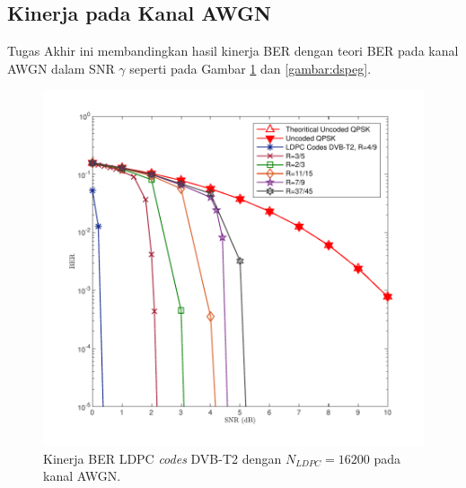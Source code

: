 \subsection{Kinerja pada Kanal AWGN}
Tugas Akhir ini membandingkan hasil kinerja BER dengan teori BER pada kanal AWGN dalam SNR $\gamma$ seperti pada Gambar \ref{fig:awgnori} dan \ref{gambar:dspeg}. 
\begin{figure}[b!]
	\centering
	\includegraphics[width=1\textwidth]
	{hasiloriAWGN.pdf}
	\caption{Kinerja BER LDPC \textit{codes} DVB-T2 dengan $N_{LDPC}=16200$ pada kanal AWGN.}
	\label{fig:awgnori}
\end{figure}


